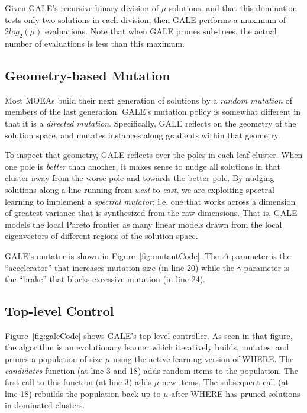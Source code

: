 \documentclass[10pt,journal,compsoc]{IEEEtran}
\newcommand{\fig}[1]{Figure~\ref{fig:#1}}
\newenvironment{changed}{\par\color{MyDarkBlue}}{\par}
\begin{document}
Given GALE's recursive binary division of $\mu$ solutions, and that this
 domination tests only two
solutions in each division, then GALE
performs  a maximum of $2log_2(\mu)$ evaluations. Note that when GALE prunes sub-trees,
the actual number of evaluations is less than this maximum.


\subsection{Geometry-based Mutation}\label{sec:geom}
Most MOEAs build their next generation of solutions
by a {\em random mutation} of members of the last
generation. GALE's mutation policy is somewhat
different in that it is a {\em directed mutation}.
Specifically, GALE reflects on the geometry of the
solution space, and mutates instances along
gradients within that geometry. 

To inspect that geometry, GALE reflects over the poles
in each leaf cluster. When one pole
is {\em better} than another, it makes sense to
nudge all solutions in that cluster away from the
worse pole and towards the better pole.
By nudging solutions along a line
running from {\em west} to {\em east}, we are
exploiting spectral learning to implement a {\em
spectral mutator}; i.e. one that works across a
dimension of greatest variance that is synthesized
from the raw dimensions.  That is, GALE models the
local Pareto frontier as many linear models
drawn from the local eigenvectors of different
regions of the solution space. 

\begin{changed}
GALE's mutator is shown in \fig{mutantCode}.
The 
$\Delta$ parameter
is the ``accelerator''
that increases mutation size (in line 20)
while the  $\gamma$ parameter is the ``brake''
that blocks excessive mutation (in line 24).

\end{changed}

\subsection{Top-level Control}

\fig{galeCode} shows GALE's top-level controller.  As seen in that figure, 
the algorithm  is an
evolutionary learner which iteratively builds,
mutates, and prunes a population of size $\mu$
using the active
learning version of WHERE.
The {\em candidates} function (at line 3 and 18) adds random items to the 
population. The first call to this function (at line 3)
adds $\mu$ new items. The subsequent call (at line 18) rebuilds the population back up to $\mu$ after
WHERE has pruned solutions in dominated clusters.
\end{document}
